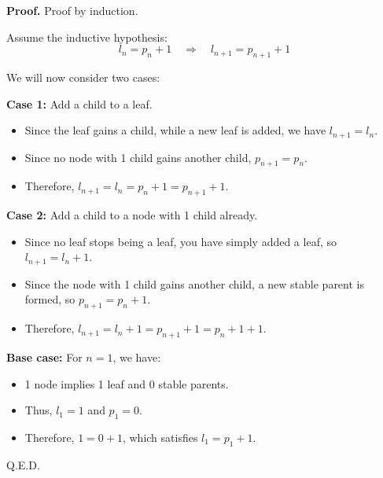 \documentclass[11pt,fleqn]{article}
\theoremstyle{definition}
\theoremstyle{remark}
\begin{document}
    \noindent \textbf{Proof.} Proof by induction.

    Assume the inductive hypothesis:
    \[
    l_n = p_n + 1 \quad \Rightarrow \quad l_{n+1} = p_{n+1} + 1
    \]

    \noindent We will now consider two cases:

    \textbf{Case 1:} Add a child to a leaf.
    \begin{itemize}
        \item Since the leaf gains a child, while a new leaf is added, we have \( l_{n+1} = l_n \).
        \item Since no node with 1 child gains another child, \( p_{n+1} = p_n \).
        \item Therefore, \( l_{n+1} = l_n = p_n + 1 = p_{n+1} + 1 \).
    \end{itemize}

    \textbf{Case 2:} Add a child to a node with 1 child already.
    \begin{itemize}
        \item Since no leaf stops being a leaf, you have simply added a leaf, so \( l_{n+1} = l_n + 1 \).
        \item Since the node with 1 child gains another child, a new stable parent is formed, so \( p_{n+1} = p_n + 1 \).
        \item Therefore, \( l_{n+1} = l_n + 1 = p_{n+1} + 1 = p_n + 1 + 1 \).
    \end{itemize}

    \noindent \textbf{Base case:} For \( n = 1 \), we have:
    \begin{itemize}
        \item 1 node implies 1 leaf and 0 stable parents.
        \item Thus, \( l_1 = 1 \) and \( p_1 = 0 \).
        \item Therefore, \( 1 = 0 + 1 \), which satisfies \( l_1 = p_1 + 1 \).
    \end{itemize}

    \noindent Q.E.D.
\newpage
\clearpage
\end{document}

